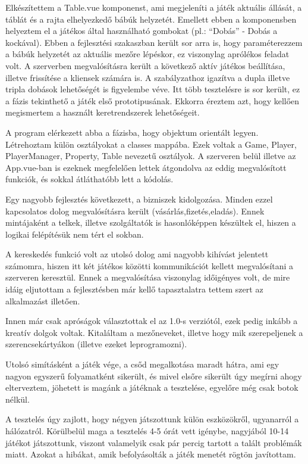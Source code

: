 	Elkészítettem a Table.vue komponenst, ami megjeleníti a játék aktuális állását, a táblát és a rajta elhelyezkedő bábúk helyzetét. Emellett ebben a komponensben helyeztem el a játékos által használható gombokat (pl.: “Dobás” - Dobás a kockával). Ebben a fejlesztési szakaszban került sor arra is, hogy paraméterezzem a bábúk helyzetét az aktuális mezőre lépéskor, ez viszonylag aprólékos feladat volt. A szerverben megvalósításra került a következő aktív játékos beállítása, illetve frissítése a kliensek számára is. A szabályzathoz igazítva a dupla illetve tripla dobások lehetőségét is figyelembe véve. Itt több tesztelésre is sor került, ez a fázis tekinthető a játék első prototipusának. Ekkorra éreztem azt, hogy kellően megismertem a használt keretrendszerek lehetőségeit.

	A program elérkezett abba a fázisba, hogy objektum orientált legyen. Létrehoztam külön osztályokat a classes mappába. Ezek voltak a Game, Player, PlayerManager, Property, Table nevezetű osztályok. A szerveren belül illetve az App.vue-ban is ezeknek megfelelően lettek átgondolva az eddig megvalósított funkciók, és sokkal átláthatóbb lett a kódolás.

	Egy nagyobb fejlesztés következett, a bizniszek kidolgozása. Minden ezzel kapcsolatos dolog megvalósításra került (vásárlás,fizetés,eladás). Ennek mintájaként a telkek, illetve szolgáltatók is hasonlóképpen készültek el, hiszen a logikai felépítésük nem tért el sokban.

	A kereskedés funkció volt az utolsó dolog ami nagyobb kihívást jelentett számomra, hiszen itt két játékos közötti kommunikációt kellett megvalósítani a szerveren keresztül. Ennek a megvalósítása viszonylag időigényes volt, de mire idáig eljutottam a fejlesztésben már kellő tapasztalatra tettem szert az alkalmazást illetően.

Innen már csak apróságok választottak el az 1.0-s verziótól, ezek pedig inkább a kreatív dolgok voltak. Kitaláltam a mezőneveket, illetve hogy mik szerepeljenek a szerencsekártyákon (illetve ezeket leprogramozni).

Utolsó simításként a játék vége, a csőd megalkotása maradt hátra, ami egy nagyon egyszerű folyamatként sikerült, és mivel elsőre sikerült úgy megírni ahogy elterveztem, jöhetett is magánk a játéknak a tesztelése, egyelőre még csak botok nélkül.

A tesztelés úgy zajlott, hogy négyen játszottunk külön eszközökről, ugyanarról a hálózatról. Körülbelül maga a tesztelés 4-5 órát vett igénybe, nagyjából 10-14 játékot játszottunk, viszont valamelyik csak pár percig tartott a talált problémák miatt. Azokat a hibákat, amik befolyásolták a játék menetét rögtön javítottam.

